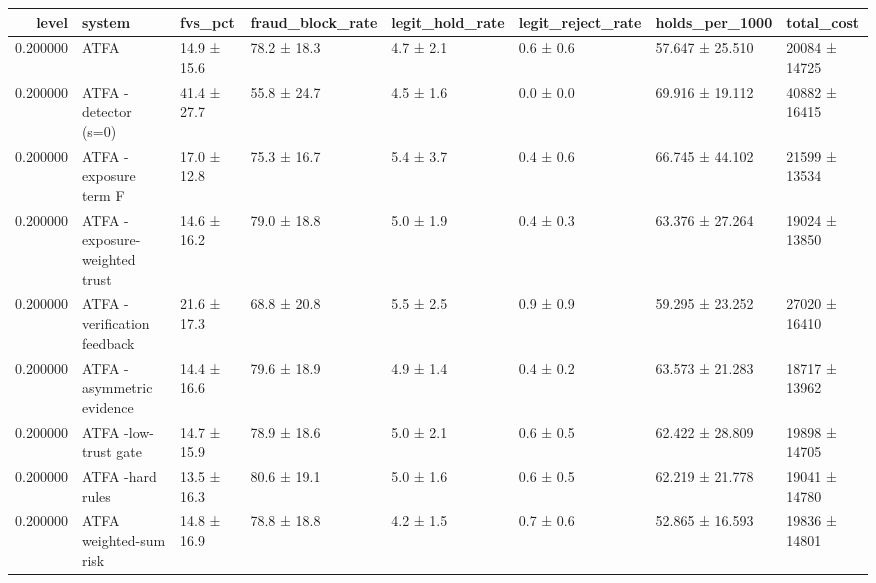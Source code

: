 \begin{tabular}{rlllllll}
\toprule
level & system & fvs\_pct & fraud\_block\_rate & legit\_hold\_rate & legit\_reject\_rate & holds\_per\_1000 & total\_cost \\
\midrule
0.200000 & ATFA & 14.9 ± 15.6 & 78.2 ± 18.3 & 4.7 ± 2.1 & 0.6 ± 0.6 & 57.647 ± 25.510 & 20084 ± 14725 \\
0.200000 & ATFA -detector (s=0) & 41.4 ± 27.7 & 55.8 ± 24.7 & 4.5 ± 1.6 & 0.0 ± 0.0 & 69.916 ± 19.112 & 40882 ± 16415 \\
0.200000 & ATFA -exposure term F & 17.0 ± 12.8 & 75.3 ± 16.7 & 5.4 ± 3.7 & 0.4 ± 0.6 & 66.745 ± 44.102 & 21599 ± 13534 \\
0.200000 & ATFA -exposure-weighted trust & 14.6 ± 16.2 & 79.0 ± 18.8 & 5.0 ± 1.9 & 0.4 ± 0.3 & 63.376 ± 27.264 & 19024 ± 13850 \\
0.200000 & ATFA -verification feedback & 21.6 ± 17.3 & 68.8 ± 20.8 & 5.5 ± 2.5 & 0.9 ± 0.9 & 59.295 ± 23.252 & 27020 ± 16410 \\
0.200000 & ATFA -asymmetric evidence & 14.4 ± 16.6 & 79.6 ± 18.9 & 4.9 ± 1.4 & 0.4 ± 0.2 & 63.573 ± 21.283 & 18717 ± 13962 \\
0.200000 & ATFA -low-trust gate & 14.7 ± 15.9 & 78.9 ± 18.6 & 5.0 ± 2.1 & 0.6 ± 0.5 & 62.422 ± 28.809 & 19898 ± 14705 \\
0.200000 & ATFA -hard rules & 13.5 ± 16.3 & 80.6 ± 19.1 & 5.0 ± 1.6 & 0.6 ± 0.5 & 62.219 ± 21.778 & 19041 ± 14780 \\
0.200000 & ATFA weighted-sum risk & 14.8 ± 16.9 & 78.8 ± 18.8 & 4.2 ± 1.5 & 0.7 ± 0.6 & 52.865 ± 16.593 & 19836 ± 14801 \\
\bottomrule
\end{tabular}

